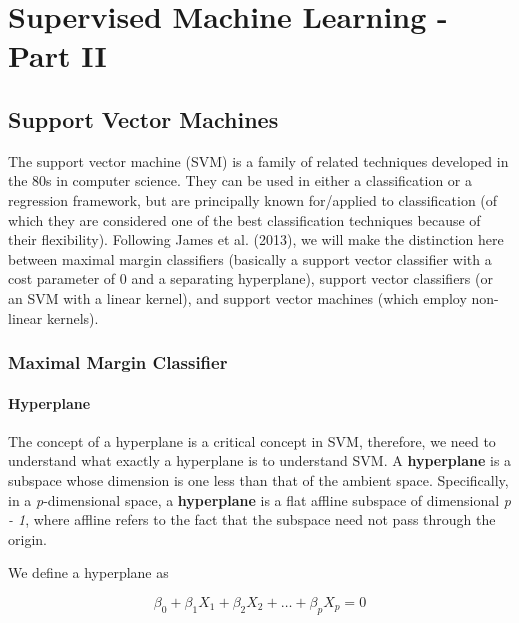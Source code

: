 \documentclass[]{book}
\begin{document}
\hypertarget{supervised-machine-learning---part-ii}{%
\chapter{Supervised Machine Learning - Part II}\label{supervised-machine-learning---part-ii}}

\hypertarget{support-vector-machines}{%
\section{Support Vector Machines}\label{support-vector-machines}}

The support vector machine (SVM) is a family of related techniques developed in the 80s in computer science. They can be used in either a classification or a regression framework, but are principally known for/applied to classification (of which they are considered one of the best classification techniques because of their flexibility). Following James et al. (2013), we will make the distinction here between maximal margin classifiers (basically a support vector classifier with a cost parameter of 0 and a separating hyperplane), support vector classifiers (or an SVM with a linear kernel), and support vector machines (which employ non-linear kernels).

\hypertarget{maximal-margin-classifier}{%
\subsection{Maximal Margin Classifier}\label{maximal-margin-classifier}}

\hypertarget{hyperplane}{%
\subsubsection{Hyperplane}\label{hyperplane}}

The concept of a hyperplane is a critical concept in SVM, therefore, we need to understand what exactly a hyperplane is to understand SVM. A \textbf{hyperplane} is a subspace whose dimension is one less than that of the ambient space. Specifically, in a \emph{p}-dimensional space, a \textbf{hyperplane} is a flat affline subspace of dimensional \emph{p - 1}, where affline refers to the fact that the subspace need not pass through the origin.

We define a hyperplane as

\[
\beta_0 + \beta_1X_1 + \beta_2X_2 + \dots + \beta_pX_p = 0
\]
\end{document}
